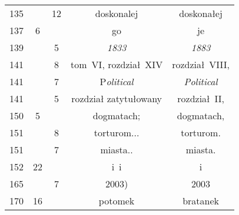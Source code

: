 \documentclass[a4paper,11pt]{article}
\begin{document}
\begin{center}
\begin{tabular}{|c|c|c|c|c|}
    135 & & 12 & doskonalej & doskonałej \\
    137 &  6 & & go & je \\
    139 & &  5 & \emph{1833} & \emph{1883} \\
    141 & &  8 & tom~VI, rozdział~XIV & rozdział~VIII, \\
    141 & &  7 & P\emph{olitical} & \emph{Political} \\
    141 & &  5 & rozdział zatytułowany & rozdział~II, \\
    150 &  5 & & dogmatach; & dogmatach, \\
    151 & &  8 & torturom... & torturom. \\
    151 & &  7 & miasta.. & miasta. \\
    152 & 22 & & i~i & i \\
    165 & &  7 & 2003) & 2003 \\
    170 & 16 & & potomek & bratanek \\
    \hline
  \end{tabular}



\end{center}
\end{document}

